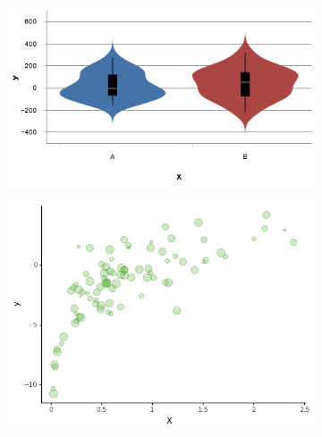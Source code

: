 \begin{figure}
\begin{subfigure}[b]{0.32\textwidth}
    \end{subfigure}
    \centering
    \begin{subfigure}[b]{0.32\textwidth}
        \centering
        \includegraphics[width=\textwidth]{figures/body/procedure/violin.png}
    \end{subfigure}
    \hfill
    \begin{subfigure}[b]{0.32\textwidth}
        \centering
        \includegraphics[width=\textwidth]{figures/body/procedure/bubble.png}
    \end{subfigure}
    \hfill
    \begin{subfigure}[b]{0.32\textwidth}
        \centering

\end{subfigure}
\end{figure}
